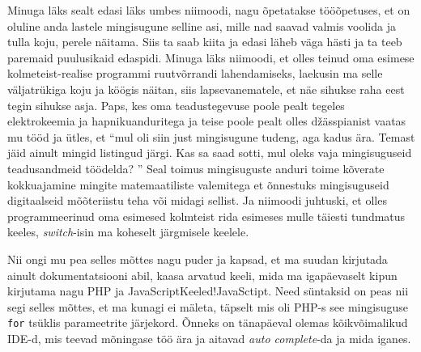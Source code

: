 Minuga läks sealt edasi läks umbes niimoodi, nagu õpetatakse tööõpetuses, et on oluline  anda lastele mingisugune selline asi, mille nad saavad valmis voolida ja tulla koju, perele näitama. Siis ta saab kiita ja edasi läheb väga hästi ja ta teeb paremaid puulusikaid edaspidi. Minuga läks niimoodi, et olles teinud oma esimese  kolmeteist-realise programmi ruutvõrrandi lahendamiseks, laekusin ma  selle väljatrükiga koju ja köögis näitan, siis  lapsevanematele, et näe sihukse raha eest tegin sihukse asja. Paps, kes oma teadustegevuse poole pealt tegeles elektrokeemia ja hapnikuanduritega ja teise poole pealt olles džässpianist vaatas mu tööd ja ütles, et \enquote{mul oli siin just mingisugune tudeng, aga kadus ära. Temast jäid ainult mingid listingud järgi. Kas sa saad sotti,  mul oleks vaja mingisuguseid  teadusandmeid töödelda? } Seal toimus mingisuguste anduri toime kõverate kokkuajamine mingite matemaatiliste valemitega et õnnestuks  mingisuguseid digitaalseid mõõteriistu teha või midagi sellist. Ja niimoodi juhtuski, et olles  programmeerinud oma esimesed kolmteist rida esimeses mulle täiesti tundmatus keeles, \emph{switch}-isin ma koheselt järgmisele keelele.

Nii ongi mu pea selles mõttes nagu puder ja kapsad, et ma suudan kirjutada ainult dokumentatsiooni abil, kaasa arvatud keeli, mida ma igapäevaselt kipun  kirjutama nagu  PHP ja JavaScript{Keeled!JavaSctipt}. Need süntaksid on peas nii segi selles mõttes, et ma kunagi ei mäleta, täpselt mis oli PHP-s see mingisuguse \verb|for| tsüklis  parameetrite järjekord. Õnneks on tänapäeval olemas kõikvõimalikud IDE-d, mis teevad mõningase töö ära ja aitavad \emph{auto complete}-da ja mida iganes. 


